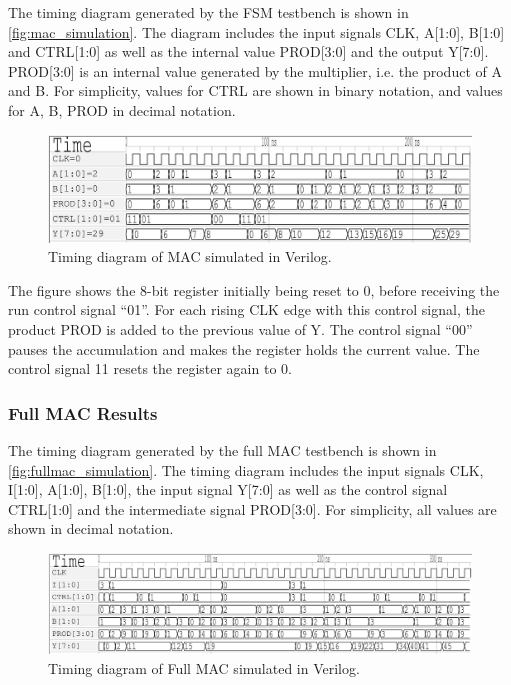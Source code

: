 The timing diagram generated by the FSM testbench is shown in \autoref{fig:mac_simulation}. The diagram includes the input signals CLK, A[1:0], B[1:0] and CTRL[1:0] as well as the internal value PROD[3:0] and the output Y[7:0]. PROD[3:0] is an internal value generated by the multiplier, i.e. the product of A and B. For simplicity,
values for CTRL are shown in binary notation, and values for A, B, PROD in decimal notation.

\begin{figure}[H]
    \centering
    \includegraphics[width=\textwidth]{Figures/Result MAC.png}
    \caption{Timing diagram of MAC simulated in Verilog.}
    \label{fig:mac_simulation}
\end{figure}

The figure shows the 8-bit register initially being reset to 0, before receiving the run control signal ``01''. For each rising CLK edge with this control signal, the product PROD is added to the previous value of Y. The control signal ``00'' pauses the accumulation and makes the register holds the current value. The control signal 11 resets the register again to 0. 

\subsubsection{Full MAC Results}

The timing diagram generated by the full MAC testbench is shown in \autoref{fig:fullmac_simulation}. The timing diagram includes the input signals CLK, I[1:0], A[1:0], B[1:0], the input signal Y[7:0] as well as the control signal CTRL[1:0] and the intermediate signal PROD[3:0]. For simplicity, all values are shown in decimal notation.

\begin{figure}[H]
    \centering
    \includegraphics[width=\textwidth]{Figures/Result full MAC3.png}
    \caption{Timing diagram of Full MAC simulated in Verilog.}
    \label{fig:fullmac_simulation}
\end{figure}

